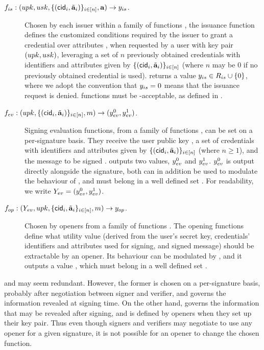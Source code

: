 \begin{description}
\item[$f_{is}: (upk,usk,\lbrace (\mathsf{cid}_i,\tilde{\mathbf{a}}_i)\rbrace_{i \in [n]},\mathbf{a})
  \rightarrow y_{is}$.] Chosen
  by each issuer within a family of functions \famfissue, the issuance function
  defines the customized conditions required by the issuer to grant a credential
  over attributes \attrs, when requested by a user with key pair $(upk,usk)$,
  leveraging a set of $n$ previously obtained credentials with identifiers and
  attributes given by $\lbrace (\mathsf{cid}_i,\tilde{\mathbf{a}}_i) \rbrace_{i \in [n]}$ (where
  $n$ may be $0$ if no previously obtained credential is used). \fissue returns
  a value $y_{is} \in R_{is} \cup \lbrace 0 \rbrace$, where we adopt the
  convention that $y_{is} = 0$ means that the issuance request is denied.
  \fissue functions must be \UAS-acceptable, as defined in
  .
\item[$f_{ev}: (upk,\lbrace(\mathsf{cid}_i,\tilde{\mathbf{a}}_i)\rbrace_{i \in [n]},m)
  \rightarrow (y_{ev}^0,y_{ev}^1)$.] Signing evaluation functions, from a
  family of functions \famfeval, can be set on a per-signature basis. They
  receive the user public key \upk, a set of credentials with identifiers
  and attributes given by $\lbrace (\mathsf{cid}_i,\tilde{\mathbf{a}}_i) \rbrace_{i \in [n]}$
  (where $n \ge 1$), and the message to be signed \msg. \feval outputs two
  values, $y_{ev}^0$ and $y_{ev}^1$. $y_{ev}^0$ is output directly alongside the
  signature,  both can in addition be used to modulate the behaviour of
  \finsp, and must belong in a well defined set \rngfeval. For readability,
  we write $Y_{ev} = (y_{ev}^0,y_{ev}^1)$.
\item[$f_{op}: (Y_{ev},upk,\lbrace \mathsf{cid}_i,\tilde{\mathbf{a}}_i\rbrace_{i \in [n]},
  m) \rightarrow y_{op}$.]
  Chosen by openers from a family of functions \famfinsp. The opening
  functions define what utility value (derived from the user's secret key,
  credentials' identifiers and attributes used for signing, and signed message)
  should be extractable by an opener. Its behaviour can be modulated by \Yeval,
  and it outputs a value \yinsp, which must belong in a well defined set
  \rngfinsp.
\end{description}

\feval and \finsp may seem redundant. However, the former is chosen on a
per-signature basis, probably after negotiation between signer and verifier, and
governs the information revealed at signing time. On the other hand, \finsp
governs the information that may be revealed after signing, and is defined by
openers when they set up their key pair. Thus even though signers and verifiers
may negotiate to use any opener for a given signature, it is not possible for
an opener to change the chosen function.

